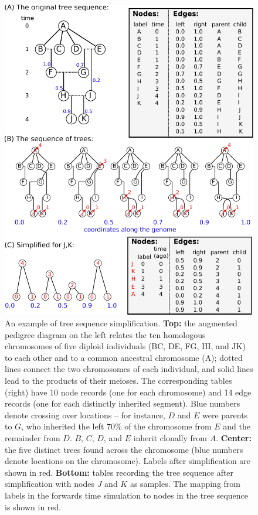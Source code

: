 \documentclass{article}
\begin{document}
\begin{figure}
    \begin{center}
        \includegraphics{method_diagram}
    \end{center}
    \caption{
        An example of tree sequence simplification.
        \textbf{Top:} the augmented pedigree diagram on the left
        relates the ten homologous chromosomes of five diploid individuals (BC, DE, FG, HI, and JK)
        to each other and to a common ancestral chromosome (A);
        dotted lines connect the two chromosomes of each individual, and solid lines lead to the products of their meioses.
        The corresponding tables (right) have 10 node records (one for each chromosome)
        and 14 edge records (one for each distinctly inherited segment).
        Blue numbers denote crossing over locations --
        for instance, $D$ and $E$ were parents to $G$,
        who inherited the left 70\% of the chromosome from $E$ and the remainder from $D$.
        $B$, $C$, $D$, and $E$ inherit clonally from $A$.
        \textbf{Center:} the five distinct trees
        found across the chromosome (blue numbers denote locations on the chromosome).
        Labels after simplification are shown in red.
        \textbf{Bottom:} tables recording the tree sequence after simplification
        with nodes $J$ and $K$ as samples.
        The mapping from labels in the forwards time simulation to nodes in the tree sequence
        is shown in red.
        \label{fig:method_diagram}
    }
\end{figure}
\end{document}
